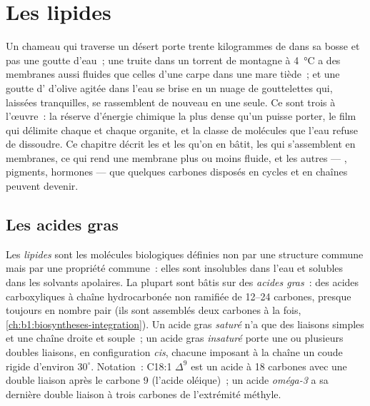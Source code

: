 \chapter{Les lipides}\label{ch:b1:lipids}

Un chameau qui traverse un désert porte trente kilogrammes de 
dans sa bosse et pas une goutte d'eau~; une truite dans un torrent de
montagne à \qty{4}{\celsius} a des membranes aussi fluides que celles
d'une carpe dans une mare tiède~; et une goutte d' d'olive agitée
dans l'eau se brise en un nuage de gouttelettes qui, laissées
tranquilles, se rassemblent de nouveau en une seule. Ce sont trois
 à l'œuvre~: la réserve d'énergie chimique la plus dense qu'un
 puisse porter, le film qui délimite chaque  et chaque
organite, et la classe de molécules que l'eau refuse de dissoudre. Ce
chapitre décrit les  et les  qu'on en bâtit, les
  qui s'assemblent en membranes, ce qui rend une
membrane plus ou moins fluide, et les autres  --- ,
pigments, hormones --- que quelques carbones disposés en cycles et en
chaînes peuvent devenir.

\section{Les acides gras}

\begin{definition}\label{def:b1:lipids:fattyacid}
Les \emph{lipides} sont les molécules biologiques définies
non par une structure commune mais par une propriété commune~: elles
sont insolubles dans l'eau et solubles dans les solvants apolaires. La
plupart sont bâtis sur des \emph{acides gras}~: des
acides carboxyliques à chaîne hydrocarbonée non ramifiée de
\qtyrange{12}{24}{} carbones, presque toujours en nombre pair (ils sont
assemblés deux carbones à la fois,
\cref{ch:b1:biosyntheses-integration}). Un acide gras
\emph{saturé} n'a que des liaisons simples et
une chaîne droite et souple~; un acide gras
\emph{insaturé} porte une ou plusieurs
doubles liaisons, en configuration \emph{cis}, chacune imposant à la
chaîne un coude rigide d'environ $30^\circ$. Notation~: C18:1
$\Delta^9$ est un acide à 18 carbones avec une double liaison après le
carbone 9 (l'acide oléique)~; un acide \emph{oméga-3} a sa dernière
double liaison à trois carbones de l'extrémité méthyle.
\end{definition}

